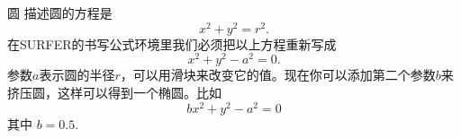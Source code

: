 ﻿\begin{surferPage}[圆]{圆}
描述圆的方程是
\[x^2+y^2=r^2.\]
在SURFER的书写公式环境里我们必须把以上方程重新写成
\[x^2+y^2-a^2=0.\]
参数$a$表示圆的半径$r$，可以用滑块来改变它的值。现在你可以添加第二个参数$b$来挤压圆，这样可以得到一个椭圆。比如
\[bx^2+y^2-a^2=0\] 其中 $b=0.5$.
\end{surferPage}



